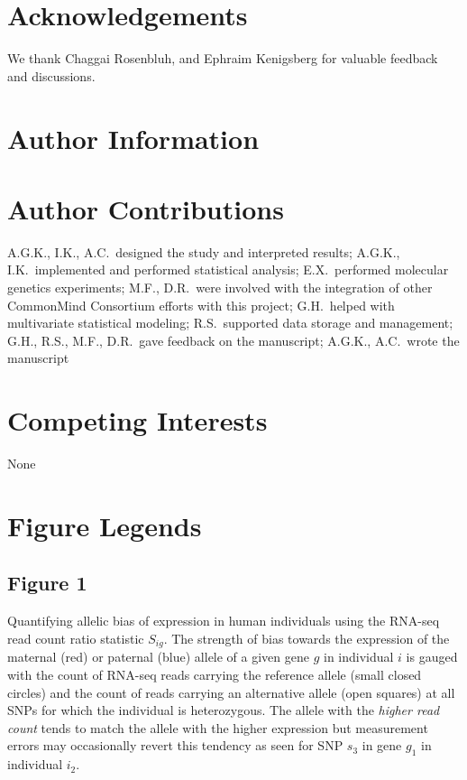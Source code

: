 \documentclass[letterpaper]{article}
\begin{document}
\section*{Acknowledgements}

We thank Chaggai Rosenbluh, and Ephraim Kenigsberg for valuable feedback and discussions.

\section*{Author Information}

\section*{Author Contributions}

A.G.K., I.K., A.C.~designed the study and interpreted results;  A.G.K.,
I.K.~implemented and performed statistical analysis; E.X.~performed molecular
genetics experiments; M.F., D.R.~were involved with the integration of other
CommonMind Consortium efforts with this project; G.H.~helped with multivariate
statistical modeling; R.S.~supported data storage and management; G.H., R.S.,
M.F., D.R.~gave feedback on the manuscript; A.G.K., A.C.~wrote the manuscript

\section*{Competing Interests}

None

\section*{Figure Legends}

\subsection*{Figure 1}

Quantifying allelic bias of expression in human
individuals using the RNA-seq read count ratio statistic \(S_{ig}\).
The strength of
bias towards the expression of the maternal (red) or paternal (blue) allele of
a given gene \(g\) in individual \(i\) is gauged with the count of RNA-seq
reads carrying the reference allele (small closed circles) and the count of
reads carrying an alternative allele (open squares) at all SNPs for which the
individual is heterozygous.  The allele with the \emph{higher read count} tends to
match the allele with the higher expression but measurement errors may
occasionally revert this tendency as seen for SNP \(s_3\) in gene \(g_1\) in
individual \(i_2\).
\end{document}
